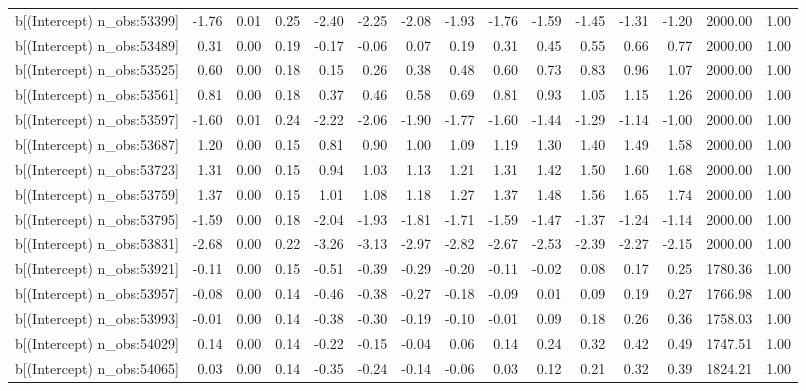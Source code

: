 \begin{table}[ht]
\begin{tabular}{rrrrrrrrrrrrrrr}
  b[(Intercept) n\_obs:53399] & -1.76 & 0.01 & 0.25 & -2.40 & -2.25 & -2.08 & -1.93 & -1.76 & -1.59 & -1.45 & -1.31 & -1.20 & 2000.00 & 1.00 \\ 
  b[(Intercept) n\_obs:53489] & 0.31 & 0.00 & 0.19 & -0.17 & -0.06 & 0.07 & 0.19 & 0.31 & 0.45 & 0.55 & 0.66 & 0.77 & 2000.00 & 1.00 \\ 
  b[(Intercept) n\_obs:53525] & 0.60 & 0.00 & 0.18 & 0.15 & 0.26 & 0.38 & 0.48 & 0.60 & 0.73 & 0.83 & 0.96 & 1.07 & 2000.00 & 1.00 \\ 
  b[(Intercept) n\_obs:53561] & 0.81 & 0.00 & 0.18 & 0.37 & 0.46 & 0.58 & 0.69 & 0.81 & 0.93 & 1.05 & 1.15 & 1.26 & 2000.00 & 1.00 \\ 
  b[(Intercept) n\_obs:53597] & -1.60 & 0.01 & 0.24 & -2.22 & -2.06 & -1.90 & -1.77 & -1.60 & -1.44 & -1.29 & -1.14 & -1.00 & 2000.00 & 1.00 \\ 
  b[(Intercept) n\_obs:53687] & 1.20 & 0.00 & 0.15 & 0.81 & 0.90 & 1.00 & 1.09 & 1.19 & 1.30 & 1.40 & 1.49 & 1.58 & 2000.00 & 1.00 \\ 
  b[(Intercept) n\_obs:53723] & 1.31 & 0.00 & 0.15 & 0.94 & 1.03 & 1.13 & 1.21 & 1.31 & 1.42 & 1.50 & 1.60 & 1.68 & 2000.00 & 1.00 \\ 
  b[(Intercept) n\_obs:53759] & 1.37 & 0.00 & 0.15 & 1.01 & 1.08 & 1.18 & 1.27 & 1.37 & 1.48 & 1.56 & 1.65 & 1.74 & 2000.00 & 1.00 \\ 
  b[(Intercept) n\_obs:53795] & -1.59 & 0.00 & 0.18 & -2.04 & -1.93 & -1.81 & -1.71 & -1.59 & -1.47 & -1.37 & -1.24 & -1.14 & 2000.00 & 1.00 \\ 
  b[(Intercept) n\_obs:53831] & -2.68 & 0.00 & 0.22 & -3.26 & -3.13 & -2.97 & -2.82 & -2.67 & -2.53 & -2.39 & -2.27 & -2.15 & 2000.00 & 1.00 \\ 
  b[(Intercept) n\_obs:53921] & -0.11 & 0.00 & 0.15 & -0.51 & -0.39 & -0.29 & -0.20 & -0.11 & -0.02 & 0.08 & 0.17 & 0.25 & 1780.36 & 1.00 \\ 
  b[(Intercept) n\_obs:53957] & -0.08 & 0.00 & 0.14 & -0.46 & -0.38 & -0.27 & -0.18 & -0.09 & 0.01 & 0.09 & 0.19 & 0.27 & 1766.98 & 1.00 \\ 
  b[(Intercept) n\_obs:53993] & -0.01 & 0.00 & 0.14 & -0.38 & -0.30 & -0.19 & -0.10 & -0.01 & 0.09 & 0.18 & 0.26 & 0.36 & 1758.03 & 1.00 \\ 
  b[(Intercept) n\_obs:54029] & 0.14 & 0.00 & 0.14 & -0.22 & -0.15 & -0.04 & 0.06 & 0.14 & 0.24 & 0.32 & 0.42 & 0.49 & 1747.51 & 1.00 \\ 
  b[(Intercept) n\_obs:54065] & 0.03 & 0.00 & 0.14 & -0.35 & -0.24 & -0.14 & -0.06 & 0.03 & 0.12 & 0.21 & 0.32 & 0.39 & 1824.21 & 1.00 \\ 

\end{tabular}
\end{table}
